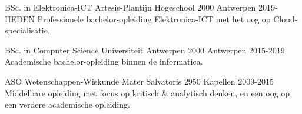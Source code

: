 
    \begin{cventries}
    
        \cventry
            {BSc. in Elektronica-ICT} %
            {Artesis-Plantijn Hogeschool} %
            {2000 Antwerpen} %
            {2019-HEDEN} %
            {Professionele bachelor-opleiding Elektronica-ICT met het oog op Cloud-specialisatie.}
            
        \cventry
            {BSc. in Computer Science} %
            {Universiteit Antwerpen} %
            {2000 Antwerpen} %
            {2015-2019} %
            {Academische bachelor-opleiding binnen de informatica.}
            
        \cventry
            {ASO Wetenschappen-Wiskunde} %
            {Mater Salvatoris} %
            {2950 Kapellen} %
            {2009-2015} %
            {Middelbare opleiding met focus op kritisch \& analytisch denken, en een oog op een verdere academische opleiding.}
    
    \end{cventries}
